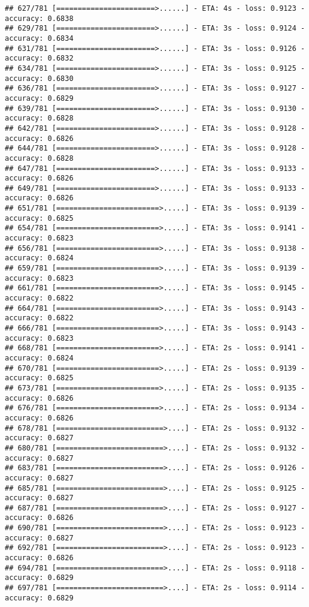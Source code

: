\documentclass[
]{article}
\begin{document}
\begin{verbatim}
## 627/781 [=======================>......] - ETA: 4s - loss: 0.9123 - accuracy: 0.6838
## 629/781 [=======================>......] - ETA: 3s - loss: 0.9124 - accuracy: 0.6834
## 631/781 [=======================>......] - ETA: 3s - loss: 0.9126 - accuracy: 0.6832
## 634/781 [=======================>......] - ETA: 3s - loss: 0.9125 - accuracy: 0.6830
## 636/781 [=======================>......] - ETA: 3s - loss: 0.9127 - accuracy: 0.6829
## 639/781 [=======================>......] - ETA: 3s - loss: 0.9130 - accuracy: 0.6828
## 642/781 [=======================>......] - ETA: 3s - loss: 0.9128 - accuracy: 0.6826
## 644/781 [=======================>......] - ETA: 3s - loss: 0.9128 - accuracy: 0.6828
## 647/781 [=======================>......] - ETA: 3s - loss: 0.9133 - accuracy: 0.6826
## 649/781 [=======================>......] - ETA: 3s - loss: 0.9133 - accuracy: 0.6826
## 651/781 [========================>.....] - ETA: 3s - loss: 0.9139 - accuracy: 0.6825
## 654/781 [========================>.....] - ETA: 3s - loss: 0.9141 - accuracy: 0.6823
## 656/781 [========================>.....] - ETA: 3s - loss: 0.9138 - accuracy: 0.6824
## 659/781 [========================>.....] - ETA: 3s - loss: 0.9139 - accuracy: 0.6823
## 661/781 [========================>.....] - ETA: 3s - loss: 0.9145 - accuracy: 0.6822
## 664/781 [========================>.....] - ETA: 3s - loss: 0.9143 - accuracy: 0.6822
## 666/781 [========================>.....] - ETA: 3s - loss: 0.9143 - accuracy: 0.6823
## 668/781 [========================>.....] - ETA: 2s - loss: 0.9141 - accuracy: 0.6824
## 670/781 [========================>.....] - ETA: 2s - loss: 0.9139 - accuracy: 0.6825
## 673/781 [========================>.....] - ETA: 2s - loss: 0.9135 - accuracy: 0.6826
## 676/781 [========================>.....] - ETA: 2s - loss: 0.9134 - accuracy: 0.6826
## 678/781 [=========================>....] - ETA: 2s - loss: 0.9132 - accuracy: 0.6827
## 680/781 [=========================>....] - ETA: 2s - loss: 0.9132 - accuracy: 0.6827
## 683/781 [=========================>....] - ETA: 2s - loss: 0.9126 - accuracy: 0.6827
## 685/781 [=========================>....] - ETA: 2s - loss: 0.9125 - accuracy: 0.6827
## 687/781 [=========================>....] - ETA: 2s - loss: 0.9127 - accuracy: 0.6826
## 690/781 [=========================>....] - ETA: 2s - loss: 0.9123 - accuracy: 0.6827
## 692/781 [=========================>....] - ETA: 2s - loss: 0.9123 - accuracy: 0.6826
## 694/781 [=========================>....] - ETA: 2s - loss: 0.9118 - accuracy: 0.6829
## 697/781 [=========================>....] - ETA: 2s - loss: 0.9114 - accuracy: 0.6829

\end{verbatim}
\end{document}
